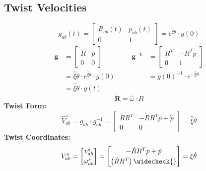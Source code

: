 \subsection{Twist Velocities}
            \vspace{0.5em}
            $$
                g_{ab}(t) = 
                    \begin{bmatrix}
                        R_{ab}(t) & p_{ab}(t)\\
                        0 & 1
                    \end{bmatrix}
                    = e^{\widehat{\xi} \theta} \cdot g(0)
            $$
            \begin{align*}
                \boldsymbol{\dot{g}} &= 
                    \begin{bmatrix}
                        \dot{R} & \dot{p}\\
                        0 & 0
                    \end{bmatrix}
                &&&
                \boldsymbol{g^{-1}} &= 
                    \begin{bmatrix}
                        R^T & -R^Tp\\
                        0 & 1
                    \end{bmatrix}
                \\
                & = \widehat{\xi} \dot{\theta} \cdot e^{\widehat{\xi} \theta} \cdot g(0)
                &&&
                &= g(0)^{-1} \cdot e^{-\widehat{\xi} \theta}
                \\
                & = \widehat{\xi} \dot{\theta} \cdot g(t)
            \end{align*}
            $$
                \boldsymbol{\dot{R}} = \widehat{\omega} \cdot R
            $$
            \vspace{-0.5em}
            \textbf{Twist Form:}
            $$
                \widehat{V}_{ab}^s = \dot{g}_{ab}^{\phantom{-l}}\! \cdot g_{ab}^{-1} = 
                    \begin{bmatrix}
                        \dot{R} R^T & - \dot{R} R^T p + \dot{p}\\
                        0 & 0
                    \end{bmatrix}
                    =
                    \widehat{\xi} \dot{\theta}
            $$
            \textbf{Twist Coordinates:}
            $$  
                V_{ab}^s = 
                    \begin{bmatrix}
                        v_{ab}^s \\[0.25em] \omega_{ab}^s
                    \end{bmatrix}
                    =
                    \begin{bmatrix}
                        -\dot{R} R^T p + \dot{p}\\[0.25em] \left( \dot{R} R^T \right) \widecheck{}
                    \end{bmatrix}
                    =
                    \xi \dot{\theta}
            $$
